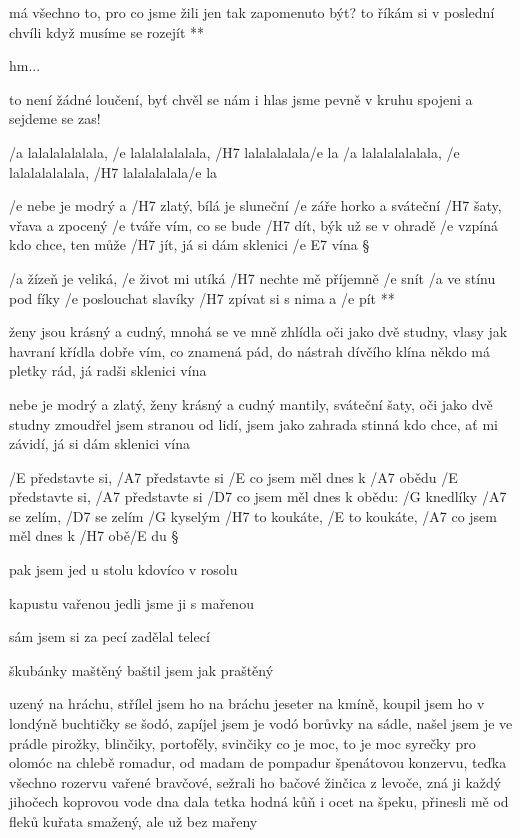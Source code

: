 \R má všechno to, pro co jsme žili
   jen tak zapomenuto být?
   to říkám si v poslední chvíli
   když musíme se rozejít **

hm... \s

to není žádné loučení, byť chvěl se nám i hlas
jsme pevně v kruhu spojeni a sejdeme se zas!




/a lalalalalalala, /e lalalalalalala, /H7 lalalalalala/e la
/a lalalalalalala, /e lalalalalalala, /H7 lalalalalala/e la \s

/e nebe je modrý a /H7 zlatý, bílá je sluneční /e záře
horko a sváteční /H7 šaty, vřava a zpocený /e tváře
vím, co se bude /H7 dít, býk už se v ohradě /e vzpíná
kdo chce, ten může /H7 jít, já si dám sklenici /{e E7} vína \S

\R /a žízeň je veliká, /e život mi utíká
   /H7 nechte mě příjemně /e snít
   /a ve stínu pod fíky /e poslouchat slavíky
   /H7 zpívat si s nima a /e pít **

ženy jsou krásný a cudný, mnohá se ve mně zhlídla
oči jako dvě studny, vlasy jak havraní křídla
dobře vím, co znamená pád, do nástrah dívčího klína
někdo má pletky rád, já radši sklenici vína \s

nebe je modrý a zlatý, ženy krásný a cudný
mantily, sváteční šaty, oči jako dvě studny
zmoudřel jsem stranou od lidí, jsem jako zahrada stinná
kdo chce, ať mi závidí, já si dám sklenici vína




/E představte si, /A7 představte si
/E co jsem měl dnes k /A7 obědu
/E představte si, /A7 představte si
/D7 co jsem měl dnes k obědu:
/G knedlíky /A7 se zelím, /D7 se zelím /G kyselým
/H7 to koukáte, /E to koukáte, /A7 co jsem měl dnes k /H7 obě/E du \S


pak jsem jed u stolu kdovíco v rosolu \s

kapustu vařenou jedli jsme ji s mařenou \s

sám jsem si za pecí zadělal telecí \s

škubánky maštěný baštil jsem jak praštěný \s

uzený na hráchu, střílel jsem ho na bráchu
jeseter na kmíně, koupil jsem ho v londýně
buchtičky se šodó, zapíjel jsem je vodó
borůvky na sádle, našel jsem je ve prádle
pirožky, blinčiky, portofěly, svinčiky
co je moc, to je moc syrečky pro olomóc
na chlebě romadur, od madam de pompadur
špenátovou konzervu, teďka všechno rozervu
vařené bravčové, sežrali ho bačové
žinčica z levoče, zná ji každý jihočech
koprovou vode dna dala tetka hodná
kůň i ocet na špeku, přinesli mě od fleků
kuřata smažený, ale už bez mařeny



